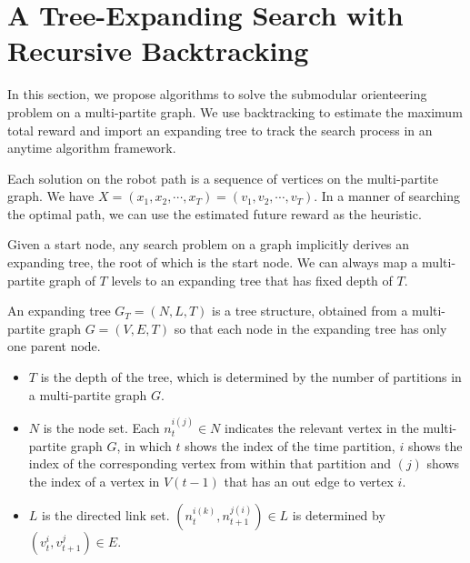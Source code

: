 \section{A Tree-Expanding Search with Recursive Backtracking}
\label{sec:tree_expanding_search}

In this section, we propose algorithms to solve the submodular orienteering problem on a multi-partite graph.
We use backtracking to estimate the maximum total reward and import an expanding tree to track the search process in an anytime algorithm framework. 

Each solution on the robot path is a sequence of vertices on the multi-partite graph.
We have $ X = ( x_{1}, x_{2} , \cdots , x_{T} ) = ( v_{1}, v_{2} , \cdots , v_{T} ) $.
In a manner of searching the optimal path, we can use the estimated future reward as the heuristic.

Given a start node, any search problem on a graph implicitly derives an expanding tree, the root of which is the start node.
We can always map a multi-partite graph of $ T $ levels to an expanding tree that has fixed depth of $ T $. 

\begin{mydef}
\label{def:expanding_tree}
An expanding tree $ G_{T} = (N, L, T) $ is a tree structure, obtained from a multi-partite graph $ G = (V, E, T) $ so that each node in the expanding tree has only one parent node.
\begin{itemize}
\item $ T $ is the depth of the tree, which is determined by the number of partitions in a multi-partite graph $ G $.
\item $ N $ is the node set. Each $ n_{t}^{i(j)} \in N $ indicates the relevant vertex in the multi-partite graph $ G $, in which $ t $ shows the index of the time partition, $ i $ shows the index of the corresponding vertex from within that partition and $ (j) $ shows the index of a vertex in $ V(t-1) $ that has an out edge to vertex $ i $.
\item $ L $ is the directed link set. $ (n^{i(k)}_{t}, n^{j(i)}_{t+1})  \in L $ is determined by $ (v^{i}_{t}, v^{j}_{t+1} ) \in E $.

\end{itemize}
\end{mydef}

